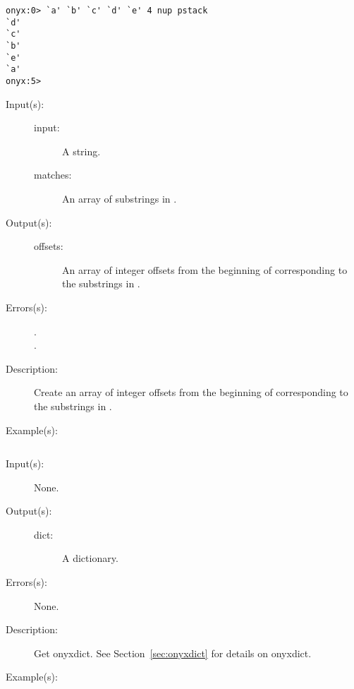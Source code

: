 \begin{description}
\begin{description}
\begin{verbatim}
onyx:0> `a' `b' `c' `d' `e' 4 nup pstack
`d'
`c'
`b'
`e'
`a'
onyx:5>
		\end{verbatim}
	\end{description}
\label{systemdict:offsets}
\item[{\onyxop{input matches}{offsets}{offsets}}: ]
	\begin{description}\item[]
	\item[Input(s): ]
		\begin{description}\item[]
		\item[input: ]
			A string.
		\item[matches: ]
			An array of substrings in .
		\end{description}
	\item[Output(s): ]
		\begin{description}\item[]
		\item[offsets: ]
			An array of integer offsets from the beginning of
			 corresponding to the substrings in
			.
		\end{description}
	\item[Errors(s): ]
		\begin{description}\item[]
		\item[.]
		\item[.]
		\end{description}
	\item[Description: ]
		Create an array of integer offsets from the beginning of
		 corresponding to the substrings in
		.
	\item[Example(s): ]\begin{verbatim}

		\end{verbatim}
	\end{description}
\label{systemdict:onyxdict}
\item[{\onyxop{--}{onyxdict}{dict}}: ]
	\begin{description}\item[]
	\item[Input(s): ] None.
	\item[Output(s): ]
		\begin{description}\item[]
		\item[dict: ]
			A dictionary.
		\end{description}
	\item[Errors(s): ] None.
	\item[Description: ]
		Get onyxdict.  See Section~\ref{sec:onyxdict} for details on
		onyxdict.
	\item[Example(s): ]\begin{verbatim}


\end{verbatim}
\end{description}
\end{description}

